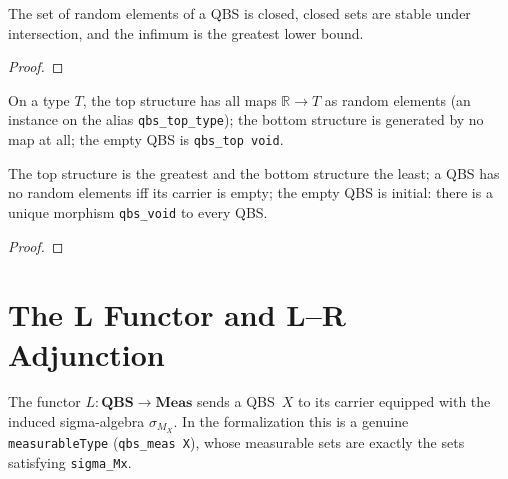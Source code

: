 \begin{lemma}\label{lem:qbs_infT_props}
  \rocqok
  The set of random elements of a QBS is closed, closed sets are stable under intersection, and the infimum is the greatest lower bound.
\end{lemma}
\begin{proof}\rocqok\end{proof}

\begin{definition}\label{def:qbs_topT}
  \rocqok
  On a type $T$, the top structure has all maps $\mathbb{R} \to T$ as random elements (an instance on the alias \texttt{qbs\_top\_type}); the bottom structure is generated by no map at all; the empty QBS is \texttt{qbs\_top void}.
\end{definition}

\begin{lemma}\label{lem:qbs_topT_props}
  \rocqok
  The top structure is the greatest and the bottom structure the least; a QBS has no random elements iff its carrier is empty; the empty QBS is initial: there is a unique morphism \texttt{qbs\_void} to every QBS.
\end{lemma}
\begin{proof}\rocqok\end{proof}


\section{The L Functor and L--R Adjunction}\label{sec:adjunction}

\begin{definition}[L Functor]\label{def:qbs_meas}
  \rocqok
  The functor $L : \mathbf{QBS} \to \mathbf{Meas}$ sends a QBS~$X$ to its
  carrier equipped with the induced sigma-algebra $\sigma_{M_X}$.
  In the formalization this is a genuine \texttt{measurableType}
  (\texttt{qbs\_meas X}), whose measurable sets are exactly the sets
  satisfying \texttt{sigma\_Mx}.
\end{definition}

